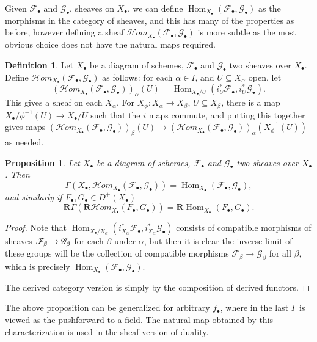 \documentclass{report}
\newtheorem{prop}[theorem]{Proposition}
\theoremstyle{definition}
\newtheorem{definition}[theorem]{Definition}
\DeclareMathOperator{\Hom}{Hom}
\newcommand{\cHom}{\mathcal{H} \textit{om}}
\newcommand{\FF}{\mathscr{F}}
\newcommand{\GG}{\mathscr{G}}
\newcommand{\bR}{\textbf{R}}
\begin{document}
Given $\FF_\bullet$ and $\GG_\bullet$, sheaves on $X_\bullet$, we can define $\Hom_{X_\bullet}(\FF_\bullet, \GG_\bullet)$ as the morphisms in the category of sheaves, and this has many of the properties as before, however defining a sheaf $\cHom_{X_\bullet}(\FF_\bullet, \GG_\bullet)$ is more subtle as the most obvious choice does not have the natural maps required.
\begin{definition}
	Let $X_\bullet$ be a diagram of schemes, $\FF_\bullet$ and $\GG_\bullet$ two sheaves over $X_\bullet$.
	Define $\cHom_{X_\bullet}(\FF_\bullet, \GG_\bullet)$ as follows: for each $\alpha \in I$, and $U \subseteq X_\alpha$ open, let
	\[
	(\cHom_{X_\bullet}(\FF_\bullet, \GG_\bullet))_\alpha(U) = \Hom_{X_\bullet/U} ( i_U^* \FF_\bullet , i_U^* \GG_\bullet).
	\]
	This gives a sheaf on each $X_\alpha$.
	For $X_\phi : X_\alpha \rightarrow X_\beta$, $U \subseteq X_\beta$, there is a map $X_\bullet / \phi^{-1}(U) \rightarrow X_\bullet / U$ such that the $i$ maps commute, and putting this together gives maps $(\cHom_{X_\bullet}(\FF_\bullet, \GG_\bullet))_\beta(U) \rightarrow (\cHom_{X_\bullet}(\FF_\bullet, \GG_\bullet))_\alpha(X_\phi^{-1}(U))$ as needed.
\end{definition}

\begin{prop}
	Let $X_\bullet$ be a diagram of schemes, $\FF_\bullet$ and $\GG_\bullet$ two sheaves over $X_\bullet$.
	Then
	\[
	\Gamma(X_\bullet, \cHom_{X_\bullet}(\FF_\bullet, \GG_\bullet)) = \Hom_{X_\bullet}(\FF_\bullet, \GG_\bullet),
	\]
	and similarly if $F_\bullet, G_\bullet \in D^+(X_\bullet)$
	\[
	\bR \Gamma (\bR \cHom_{X_\bullet}(F_\bullet, G_\bullet)) = \bR \Hom_{X_\bullet}(F_\bullet, G_\bullet).
	\]
\end{prop}
\begin{proof}
	Note that $ \Hom_{X_\bullet / X_\alpha} ( i_{X_\alpha}^* \FF_\bullet , i_{X_\alpha}^* \GG_\bullet)$ consists of compatible morphisms of sheaves $\FF_\beta \rightarrow\nobreak \GG_\beta$ for each $\beta$ under $\alpha$, but then it is clear the inverse limit of these groups will be the collection of compatible morphisms $\FF_\beta \rightarrow \GG_\beta$ for all $\beta$, which is precisely $\Hom_{X_\bullet}(\FF_\bullet, \GG_\bullet)$.
	
	The derived category version is simply by the composition of derived functors.
\end{proof}

The above proposition can be generalized for arbitrary $f_\bullet$, where in the last $\Gamma$ is viewed as the pushforward to a field.
The natural map obtained by this characterization is used in the sheaf version of duality.
\end{document}
